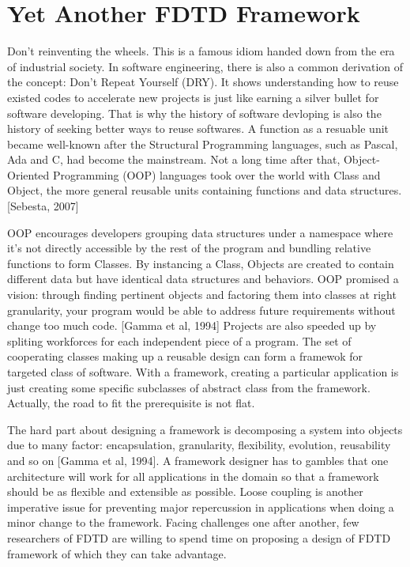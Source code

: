 \section{Yet Another FDTD Framework}

Don't reinventing the wheels. This is a famous idiom handed down from the era of industrial society. In software
engineering, there is also a common derivation of the concept: Don't Repeat Yourself (DRY). It shows understanding how
to reuse existed codes to accelerate new projects is just like earning a silver bullet for software developing. That is
why the history of software devloping is also the history of seeking better ways to reuse softwares. A function as a
resuable unit became well-known after the Structural Programming languages, such as Pascal, Ada and C, had become the
mainstream. Not a long time after that, Object-Oriented Programming (OOP) languages took over the world with Class and
Object, the more general reusable units containing functions and data structures. [Sebesta, 2007]

OOP encourages developers grouping data structures under a namespace where it's not directly accessible by the rest of
the program and bundling relative functions to form Classes. By instancing a Class, Objects are created to contain
different data but have identical data structures and behaviors. OOP promised a vision: through finding pertinent
objects and factoring them into classes at right granularity, your program would be able to address future requirements
without change too much code. [Gamma et al, 1994] Projects are also speeded up by spliting workforces for each
independent piece of a program. The set of cooperating classes making up a reusable design can form a framewok for
targeted class of software. With a framework, creating a particular application is just creating some specific
subclasses of abstract class from the framework. Actually, the road to fit the prerequisite is not flat.

The hard part about designing a framework is decomposing a system into objects due to many factor: encapsulation,
granularity, flexibility, evolution, reusability and so on [Gamma et al, 1994]. A framework designer has to gambles that
one architecture will work for all applications in the domain so that a framework should be as flexible and extensible
as possible. Loose coupling is another imperative issue for preventing major repercussion in applications when doing a
minor change to the framework. Facing challenges one after another, few researchers of FDTD are willing to spend time on
proposing a design of FDTD framework of which they can take advantage.

